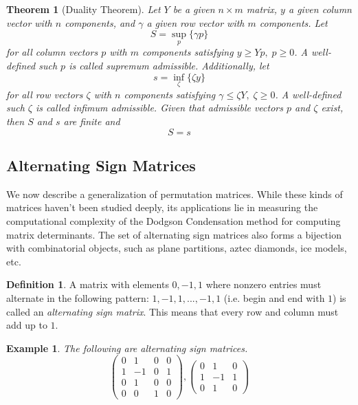 \documentclass{article}
\newtheorem{theorem}{Theorem}[section]
\newtheorem{example}{Example}[section]
\theoremstyle{remark}
\theoremstyle{definition}
\newtheorem{definition}{Definition}[section]
\begin{document}
    \begin{theorem}[Duality Theorem]
    Let $Y$ be a given $n \times m$ matrix, $y$ a given column vector with $n$ components, and $\gamma$ a given row vector with $m$ components. Let 
    \[S = \sup_p \{\gamma p\}\]
    for all column vectors $p$ with $m$ components satisfying $y \geq Y p, \; p \geq 0$. A well-defined such $p$ is called \textit{supremum admissible}. Additionally, let 
    \[s = \inf_\zeta \{ \zeta y\}\]
    for all row vectors $\zeta$ with $n$ components satisfying $\gamma \leq \zeta Y, \; \zeta \geq 0$. A well-defined such $\zeta$ is called \textit{infimum admissible}. Given that admissible vectors $p$ and $\zeta$ exist, then $S$ and $s$ are finite and 
    \[S = s\]
    \end{theorem}

  \subsection{Alternating Sign Matrices}

    We now describe a generalization of permutation matrices. While these kinds of matrices haven't been studied deeply, its applications lie in measuring the computational complexity of the Dodgson Condensation method for computing matrix determinants. The set of alternating sign matrices also forms a bijection with combinatorial objects, such as plane partitions, aztec diamonds, ice models, etc. 

    \begin{definition}
    A matrix with elements $0, -1, 1$ where nonzero entries must alternate in the following pattern: $1, -1, 1, ..., -1, 1$ (i.e. begin and end with $1$) is called an \textit{alternating sign matrix}. This means that every row and column must add up to $1$. 
    \end{definition}

    \begin{example}
    The following are alternating sign matrices. 
    \[\begin{pmatrix}
    0&1&0&0\\1&-1&0&1\\0&1&0&0\\0&0&1&0
    \end{pmatrix}, \begin{pmatrix}
    0&1&0\\1&-1&1\\0&1&0
    \end{pmatrix}\]
    \end{example}
\end{document}
